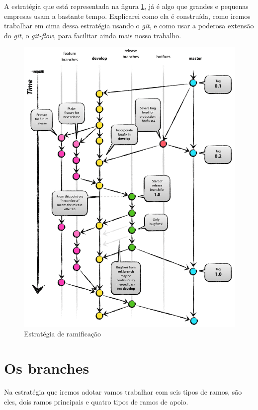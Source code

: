 \documentclass[12pt,openright,oneside,a4paper,english,brazil]{abntex2}
\begin{document}
A estratégia que está representada na figura \ref{estrategia}, já é algo que grandes e pequenas empresas usam a bastante tempo. Explicarei como ela é construída, como iremos trabalhar em cima dessa estratégia usando o \textit{git}, e como usar a poderosa extensão do \textit{git}, o \textit{\textit{git-flow}}, para facilitar ainda mais nosso trabalho. 


 \begin{figure}[h]
 	\caption{\label{estrategia}Estratégia de ramificação}
 	\begin{center}
 		\includegraphics[width=0.85\linewidth]{estrategia}
 	\end{center}
 \end{figure}


\section{Os branches}

Na estratégia que iremos adotar vamos trabalhar com seis tipos de ramos, são eles, dois ramos principais e quatro tipos de ramos de apoio. 
\end{document}
